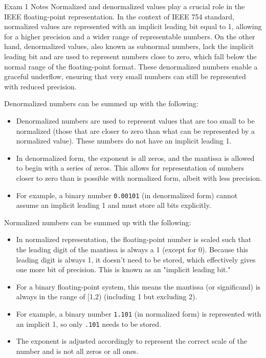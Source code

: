 \begin{examnotes}{Exam 1 Notes}
    Normalized and denormalized values play a crucial role in the IEEE floating-point representation. In the context of IEEE 754 standard, normalized values are represented with an implicit leading 
    bit equal to 1, allowing for a higher precision and a wider range of representable numbers. On the other hand, denormalized values, also known as subnormal numbers, lack the implicit leading bit 
    and are used to represent numbers close to zero, which fall below the normal range of the floating-point format. These denormalized numbers enable a graceful underflow, ensuring that very small 
    numbers can still be represented with reduced precision.

    Denormalized numbers can be summed up with the following:

    \begin{itemize}
        \item Denormalized numbers are used to represent values that are too small to be normalized (those that are closer to zero than what can be represented by a normalized value). These numbers 
        do not have an implicit leading 1.
        \item In denormalized form, the exponent is all zeros, and the mantissa is allowed to begin with a series of zeros. This allows for representation of numbers closer to zero than is possible 
        with normalized form, albeit with less precision.
        \item For example, a binary number \texttt{0.00101} (in denormalized form) cannot assume an implicit leading 1 and must store all bits explicitly.
    \end{itemize}

    Normalized numbers can be summed up with the following:

    \begin{itemize}
        \item In normalized representation, the floating-point number is scaled such that the leading digit of the mantissa is always a 1 (except for 0). Because this leading digit is always 1, it 
        doesn't need to be stored, which effectively gives one more bit of precision. This is known as an "implicit leading bit."
        \item For a binary floating-point system, this means the mantissa (or significand) is always in the range of [1,2) (including 1 but excluding 2).
        \item For example, a binary number \texttt{1.101} (in normalized form) is represented with an implicit 1, so only \texttt{.101} needs to be stored.
        \item The exponent is adjusted accordingly to represent the correct scale of the number and is not all zeros or all ones.
    \end{itemize}


\end{examnotes}
